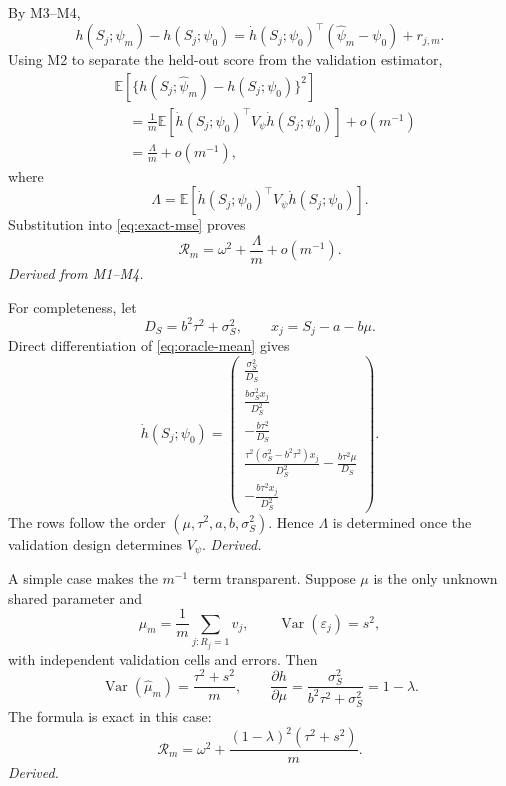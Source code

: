 \documentclass[11pt]{article}
\newcommand{\E}{\mathbb E}
\newcommand{\Var}{\operatorname{Var}}
\begin{document}
By M3--M4,
\begin{equation}
 h(S_j;\widehat\psi_m)-h(S_j;\psi_0)
 =\dot h(S_j;\psi_0)^\top(\widehat\psi_m-\psi_0)+r_{j,m}.
 \label{eq:taylor}
\end{equation}
Using M2 to separate the held-out score from the validation estimator,
\begin{align}
 &\E[\{h(S_j;\widehat\psi_m)-h(S_j;\psi_0)\}^2] \\
 &\quad=\frac1m
 \E[\dot h(S_j;\psi_0)^\top V_\psi\dot h(S_j;\psi_0)]
 +o(m^{-1}) \\
 &\quad=\frac{\Lambda}{m}+o(m^{-1}),
 \label{eq:estimated-parameter-error}
\end{align}
where
\begin{equation}
 \Lambda
 =\E[\dot h(S_j;\psi_0)^\top V_\psi\dot h(S_j;\psi_0)].
 \label{eq:lambda-definition}
\end{equation}
Substitution into \eqref{eq:exact-mse} proves
\begin{equation}
 \mathcal R_m
 =\omega^2+\frac{\Lambda}{m}+o(m^{-1}).
 \label{eq:final-mse}
\end{equation}
\emph{Derived from M1--M4.}

For completeness, let
\begin{equation}
 D_S=b^2\tau^2+\sigma_S^2,
 \qquad
 x_j=S_j-a-b\mu.
\end{equation}
Direct differentiation of \eqref{eq:oracle-mean} gives
\begin{equation}
 \dot h(S_j;\psi_0)
 =
 \begin{pmatrix}
 \displaystyle \frac{\sigma_S^2}{D_S}\\[0.65em]
 \displaystyle \frac{b\sigma_S^2x_j}{D_S^2}\\[0.65em]
 \displaystyle -\frac{b\tau^2}{D_S}\\[0.65em]
 \displaystyle
 \frac{\tau^2(\sigma_S^2-b^2\tau^2)x_j}{D_S^2}
 -\frac{b\tau^2\mu}{D_S}\\[0.65em]
 \displaystyle -\frac{b\tau^2x_j}{D_S^2}
 \end{pmatrix}.
 \label{eq:gradient}
\end{equation}
The rows follow the order
\((\mu,\tau^2,a,b,\sigma_S^2)\). Hence \(\Lambda\) is determined once the
validation design determines \(V_\psi\). \emph{Derived.}

A simple case makes the \(m^{-1}\) term transparent. Suppose \(\mu\) is the
only unknown shared parameter and
\begin{equation}
 \widehat\mu_m=\frac1m\sum_{j:R_j=1}\widehat v_j,
 \qquad
 \Var(\varepsilon_j)=s^2,
\end{equation}
with independent validation cells and errors. Then
\begin{equation}
 \Var(\widehat\mu_m)=\frac{\tau^2+s^2}{m},
 \qquad
 \frac{\partial h}{\partial\mu}
 =\frac{\sigma_S^2}{b^2\tau^2+\sigma_S^2}
 =1-\lambda.
\end{equation}
The formula is exact in this case:
\begin{equation}
 \mathcal R_m
 =\omega^2+
 \frac{(1-\lambda)^2(\tau^2+s^2)}{m}.
 \label{eq:special-case}
\end{equation}
\emph{Derived.}
\end{document}
